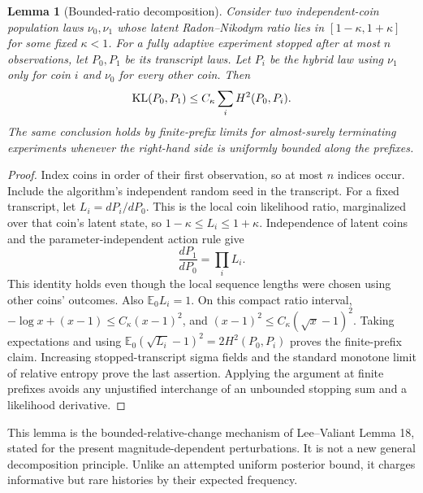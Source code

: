 \documentclass[11pt]{article}
\newtheorem{lemma}[theorem]{Lemma}
\theoremstyle{definition}\newtheorem{conjecture}[theorem]{Conjecture}
\theoremstyle{remark}\newtheorem{remark}[theorem]{Remark}
\newcommand{\E}{\mathbb E}\newcommand{\PP}{\mathbb P}\newcommand{\R}{\mathbb R}
\begin{document}
\begin{lemma}[Bounded-ratio decomposition]\label{lem:hybrid}
Consider two independent-coin population laws $\nu_0,\nu_1$ whose latent Radon--Nikodym ratio lies in $[1-\kappa,1+\kappa]$ for some fixed $\kappa<1$. For a fully adaptive experiment stopped after at most $n$ observations, let $P_0,P_1$ be its transcript laws. Let $P_i$ be the hybrid law using $\nu_1$ only for coin $i$ and $\nu_0$ for every other coin. Then
\[
 \operatorname{KL}(P_0,P_1)\le C_\kappa\sum_i H^2(P_0,P_i).
\]
The same conclusion holds by finite-prefix limits for almost-surely terminating experiments whenever the right-hand side is uniformly bounded along the prefixes.
\end{lemma}
\begin{proof}
Index coins in order of their first observation, so at most $n$ indices occur. Include the algorithm's independent random seed in the transcript. For a fixed transcript, let $L_i=dP_i/dP_0$. This is the local coin likelihood ratio, marginalized over that coin's latent state, so $1-\kappa\le L_i\le1+\kappa$. Independence of latent coins and the parameter-independent action rule give
\[
 \frac{dP_1}{dP_0}=\prod_iL_i.
\]
This identity holds even though the local sequence lengths were chosen using other coins' outcomes. Also $\E_0L_i=1$. On this compact ratio interval,
$-\log x+(x-1)\le C_\kappa(x-1)^2$, and
$(x-1)^2\le C_\kappa(\sqrt x-1)^2$. Taking expectations and using
$\E_0(\sqrt{L_i}-1)^2=2H^2(P_0,P_i)$ proves the finite-prefix claim. Increasing stopped-transcript sigma fields and the standard monotone limit of relative entropy prove the last assertion. Applying the argument at finite prefixes avoids any unjustified interchange of an unbounded stopping sum and a likelihood derivative.
\end{proof}

This lemma is the bounded-relative-change mechanism of Lee--Valiant Lemma 18, stated for the present magnitude-dependent perturbations. It is not a new general decomposition principle. Unlike an attempted uniform posterior bound, it charges informative but rare histories by their expected frequency.
\end{document}
